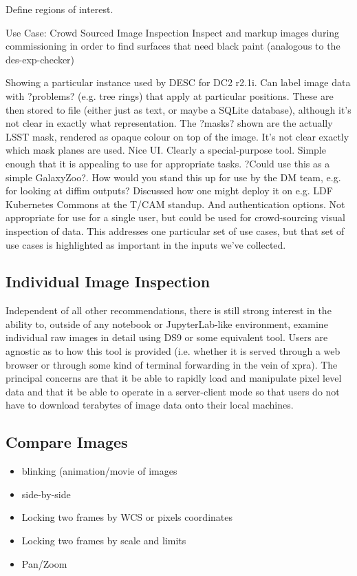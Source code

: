 
Define regions of interest.

Use Case: Crowd Sourced Image Inspection
Inspect and markup images during commissioning in order to find surfaces that need black paint (analogous to the des-exp-checker)


Showing a particular instance used by DESC for DC2 r2.1i.
Can label image data with ?problems? (e.g. tree rings) that apply at particular positions.
These are then stored to file (either just as text, or maybe a SQLite database), although it's not clear in exactly what representation.
The ?masks? shown are the actually LSST mask, rendered as opaque colour on top of the image.
It's not clear exactly which mask planes are used.
Nice UI.
Clearly a special-purpose tool.
Simple enough that it is appealing to use for appropriate tasks.
?Could use this as a simple GalaxyZoo?.
How would you stand this up for use by the DM team, e.g. for looking at diffim outputs?
Discussed how one might deploy it on e.g. LDF Kubernetes Commons at the T/CAM standup.
And authentication options.
Not appropriate for use for a single user, but could be used for crowd-sourcing visual inspection of data.
This addresses one particular set of use cases, but that set of use cases is highlighted as important in the inputs we've collected.

\subsection{Individual Image Inspection}
\label{sec:ds9}
Independent of all other recommendations, there is still strong interest in the
ability to, outside of any notebook or JupyterLab-like environment, examine
individual raw images in detail using DS9 or some equivalent tool.  Users are
agnostic as to how this tool is provided (i.e. whether it is served through a
web browser or through some kind of terminal forwarding in the vein of xpra).
The principal concerns are that it be able to rapidly load and manipulate pixel
level data and that it be able to operate in a server-client mode so that users
do not have to download terabytes of image data onto their local machines.


\subsection{Compare Images}
\begin{itemize}
\item{blinking (animation/movie of images}
\item{side-by-side}
\item{Locking two frames by WCS or pixels coordinates}
\item{Locking two frames by scale and limits}
\item{Pan/Zoom}
\end{itemize}

